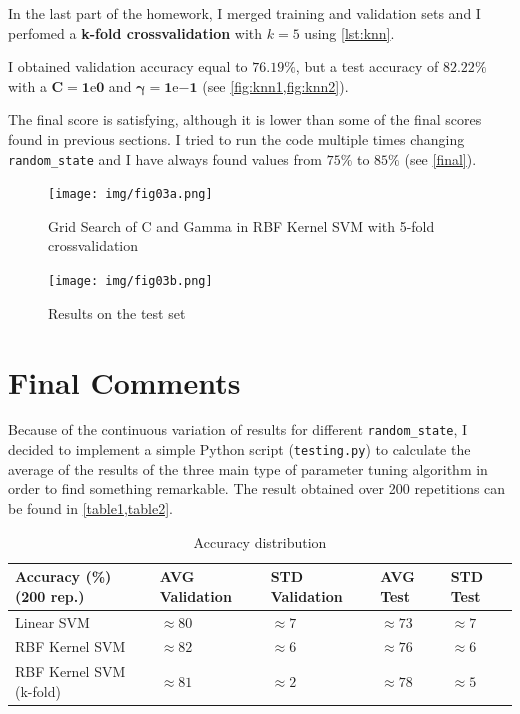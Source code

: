 \documentclass[a4paper, 11pt]{article}
\begin{document}
	In the last part of the homework, I merged training and validation sets and I perfomed a \textbf{k-fold crossvalidation} with $k=5$ using \vref{lst:knn}.
	
	
	
	I obtained validation accuracy equal to $\boldsymbol{76.19\%}$, but a test accuracy of $\boldsymbol{82.22\%}$ with a $\boldsymbol{C=1\mathrm{e}{0}}$ and $\boldsymbol{\gamma=1\mathrm{e}{-1}}$ (see \vref{fig:knn1,fig:knn2}).
	
	The final score is satisfying, although it is lower than some of the final scores found in previous sections. I tried to run the code multiple times changing \texttt{random\_state} and I have always found values from $75\%$ to $85\%$  (see \vref{final}).
	
	\begin{figure}[ht!]
		\centering
		\texttt{[image: img/fig03a.png]}
		\caption{Grid Search of C and Gamma in RBF Kernel SVM with 5-fold crossvalidation}
		\label{fig:knn1}
	\end{figure}
	
	\begin{figure}[ht!]
		\centering
		\texttt{[image: img/fig03b.png]}
		\caption{Results on the test set}
		\label{fig:knn2}
	\end{figure}

	\section{Final Comments} \label{final}
	
	Because of the continuous variation of results for different \texttt{random\_state}, I decided to implement a simple Python script (\texttt{testing.py}) to calculate the average of the results of the three main type of parameter tuning algorithm in order to find something remarkable.
	The result obtained over 200 repetitions can be found in \vref{table1,table2}.

	\begin{table}[!h]
		\centering
		\caption{Accuracy distribution}
		\label{table1}
		\begin{tabular}{@{}lllll@{}}
			\toprule
			\textbf{Accuracy (\%)} (200 rep.)		& AVG Validation	& STD Validation	& AVG Test		& STD Test \\ \midrule
			Linear SVM				& $\approx80$	 	&  $\approx7$		& $\approx73$ & $\approx7$ \\
			RBF Kernel SVM			& $\approx82$	 	&  $\approx6$		& $\approx76$ & $\approx6$ \\
			RBF Kernel SVM (k-fold)	& $\approx81$	 	&  $\approx2$		& $\approx78$ & $\approx5$ \\ \bottomrule
		\end{tabular}
	\end{table}
\end{document}
